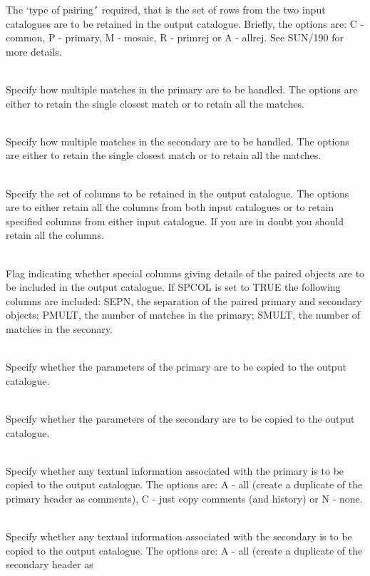 \documentclass[twoside,11pt]{article}
\renewcommand{\_}{\texttt{\symbol{95}}}
\newcommand{\sstsubsection}[1]{ \item[{#1}] \mbox{} \\}
\newcommand{\sstsubsection}[1]{\item[{#1}]}
\begin{document}
\begin{htmlonly}
{{{      }{
         The `type of pairing{\tt '} required, that is the set of rows from the
         two input catalogues are to be retained in the output catalogue.
         Briefly, the options are: C - common, P - primary, M - mosaic,
         R - primrej or A - allrej.  See SUN/190 for more details.
      }
      \sstsubsection{
         MULTP  =  LOGICAL (read)
      }{
         Specify how multiple matches in the primary are to be handled.
         The options are either to retain the single closest match or to
         retain all the matches.
      }
      \sstsubsection{
         MULTS  =  LOGICAL (read)
      }{
         Specify how multiple matches in the secondary are to be handled.
         The options are either to retain the single closest match or to
         retain all the matches.
      }
      \sstsubsection{
         ALLCOL  =  LOGICAL (read)
      }{
         Specify the set of columns to be retained in the output catalogue.
         The options are to either retain all the columns from both input
         catalogues or to retain specified columns from either input
         catalogue.  If you are in doubt you should retain all the columns.
      }
      \sstsubsection{
         SPCOL  =  LOGICAL (read)
      }{
         Flag indicating whether special columns giving details of the
         paired objects are to be included in the output catalogue.
         If SPCOL is set to TRUE the following columns are included:
         SEPN, the separation of the paired primary and secondary objects;
         PMULT, the number of matches in the primary;
         SMULT, the number of matches in the seconary.
      }
      \sstsubsection{
         PRMPAR  =  LOGICAL (read)
      }{
         Specify whether the parameters of the primary are to be copied to
         the output catalogue.
      }
      \sstsubsection{
         SECPAR  =  LOGICAL (read)
      }{
         Specify whether the parameters of the secondary are to be copied
         to the output catalogue.
      }
      \sstsubsection{
         PTEXT  =  CHARACTER (read)
      }{
         Specify whether any textual information associated with the
         primary is to be copied to the output catalogue.  The options
         are: A - all (create a duplicate of the primary header as
         comments), C - just copy comments (and history) or N - none.
      }
      \sstsubsection{
         STEXT  =  CHARACTER (read)
      }{
         Specify whether any textual information associated with the
         secondary is to be copied to the output catalogue.  The options
         are: A - all (create a duplicate of the secondary header as
}}}
\end{htmlonly}
\end{document}
